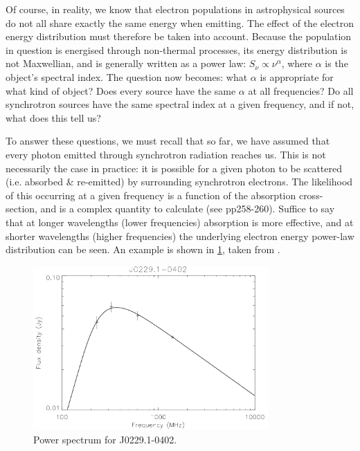 \pg
Of course, in reality, we know that electron populations in astrophysical sources do not all share exactly the same energy when emitting. The effect of the electron energy distribution must therefore be taken into account. Because the population in question is energised through non-thermal processes, its energy distribution is not Maxwellian, and is generally written as a power law: $S_\nu \propto \nu^{\alpha}$, where $\alpha$ is the object's spectral index. %
The question now becomes: what $\alpha$ is appropriate for what kind of object? Does every source have the same $\alpha$ at all frequencies? Do all synchrotron sources have the same spectral index at a given frequency, and if not, what does this tell us?

\pg
To answer these questions, we must recall that so far, we have assumed that every photon emitted through synchrotron radiation reaches us. This is not necessarily the case in practice: it is possible for a given photon to be scattered (i.e. absorbed \& re-emitted) by surrounding synchrotron electrons. The likelihood of this occurring at a given frequency is a function of the absorption cross-section, and is a complex quantity to calculate (see  pp258-260). Suffice to say that at longer wavelengths (lower frequencies) absorption is more effective, and at shorter wavelengths (higher frequencies) the underlying electron energy power-law  distribution can be seen. An example is shown in \cref{fig.synchrotron}, taken from .

\begin{figure}[!h]
\centering
\includegraphics[width=0.8\textwidth]{images/synchrotron-spectrum.png}
\caption{\label{fig.synchrotron} Power spectrum for J0229.1-0402.}
\end{figure}

